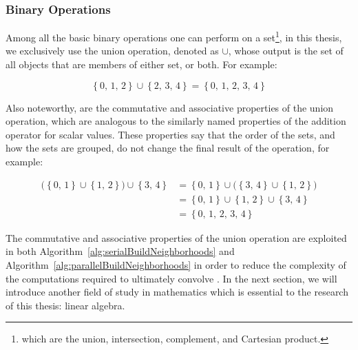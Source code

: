 %
%
\subsubsection{Binary Operations}
\label{ch2sETBssSTsssBO}
Among all the basic binary operations one can perform on a set\footnote{which are the union, intersection, complement, and Cartesian product.}, in this thesis, we exclusively use the union operation, denoted as $\cup$, whose output is the set of all objects that are members of either set, or both. For example:

\begin{equation}
	\left \{0,\,1,\,2\right \} \cup \left \{2,\,3,\,4\right \} = \left \{0,\,1,\,2,\,3,\,4\right \}
\end{equation}

Also noteworthy, are the commutative and associative properties of the union operation, which are analogous to the similarly named properties of the addition operator for scalar values. These properties say that the order of the sets, and how the sets are grouped, do not change the final result of the operation, for example:

\begin{equation}
\begin{aligned}
	\big( \left \{0,\,1\right \} \cup \left \{1,\,2\right \} \big) \cup \left \{3,\,4\right \} & = \left \{0,\,1\right \} \cup \big( \left \{3,\,4\right \} \cup \left \{1,\,2\right \}\big) \\
	& = \left \{0,\,1\right \} \cup \left \{1,\,2\right \} \cup \left \{3,\,4\right \} \\
	& = \left \{0,\,1,\,2,\,3,\,4\right \}
	\label{eq:ascAndComPropertiesOfUnions}
\end{aligned}
\end{equation}

The commutative and associative properties of the union operation are exploited in both Algorithm~\ref{alg:serialBuildNeighborhoods} and Algorithm~\ref{alg:parallelBuildNeighborhoods} in order to reduce the complexity of the computations required to ultimately convolve . In the next section, we will introduce another field of study in mathematics which is essential to the research of this thesis: linear algebra.

%
%
%
%
